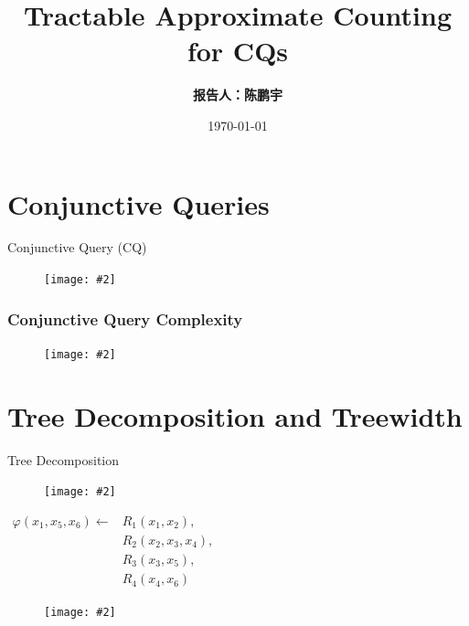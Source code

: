 \documentclass{beamer}
\title{Tractable Approximate Counting for CQs}
\author{\textbf{报告人：陈鹏宇}}
\institute{\textbf{哈尔滨工业大学}}
\date{\today}
\newcommand{\pic}[2][100]{
	\begin{figure}
		\centering
		\texttt{[image: \#2]}
	\end{figure}
}
\begin{document}
	\frame{\titlepage}
	\section{Conjunctive Queries}
	\begin{frame}{Conjunctive Query (CQ)}
		\pic{pics/CQ}
	\end{frame}
	\begin{frame}
		\frametitle{Conjunctive Query Complexity}
		\pic{pics/scq}
	\end{frame}

	
	\section{Tree Decomposition and Treewidth}
	\begin{frame}{Tree Decomposition}
		\pic{pics/treewidthdef}
		\begin{example}[Treewidth=2]
				\vspace{-2ex}
			\begin{multicols}{2}
				\centering
				$
				\begin{aligned}
					\varphi(x_1,x_5,x_6)\leftarrow&R_1(x_1,x_2),\\
					&R_2(x_2,x_3,x_4),\\
					&R_3(x_3,x_5),\\
					&R_4(x_4,x_6)
				\end{aligned}
				$
				\newcolumn
				\centering
				\pic[40]{pics/ExampleCQ}
			\end{multicols}
		\vspace{-2ex}
		\end{example}
	\end{frame}
	
\end{document}
